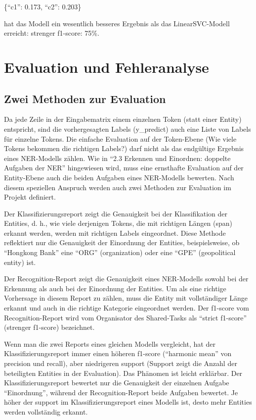 \documentclass[paper=A4, ngerman, fontsize=12pt]{article}
\begin{document}
	\indent
	 \{\enquote{c1}: 0.173, \enquote{c2}: 0.203\}
	 
	 \indent
	 hat das Modell ein wesentlich besseres Ergebnis als das LinearSVC-Modell erreicht: strenger f1-score: 75\%.
	 
	\section{Evaluation und Fehleranalyse}
	
	\subsection{Zwei Methoden zur Evaluation}
	\noindent
	Da jede Zeile in der Eingabematrix einem einzelnen Token (statt einer Entity) entspricht, sind die vorhergesagten Labels (y\_predict) auch eine Liste von Labels für einzelne Tokens. Die einfache Evaluation auf der Token-Ebene (Wie viele Tokens bekommen die richtigen Labels?) darf nicht als das endgültige Ergebnis eines NER-Modells zählen. Wie in \enquote{2.3 Erkennen und Einordnen: doppelte Aufgaben der NER} hingewiesen wird, muss eine ernsthafte Evaluation auf der Entity-Ebene auch die beiden Aufgaben eines NER-Modells bewerten. Nach diesem speziellen Anspruch werden auch zwei Methoden zur Evaluation im Projekt definiert. 
	
	\indent
	Der Klassifizierungsreport zeigt die Genauigkeit bei der Klassifikation der Entities, d. h., wie viele derjenigen Tokens, die mit richtigen Längen (span) erkannt werden, werden mit richtigen Labels eingeordnet. Diese Methode reflektiert nur die Genauigkeit der Einordnung der Entities, beispielsweise, ob \enquote{Hongkong Bank} eine \enquote{ORG} (organization) oder eine \enquote{GPE} (geopolitical entity) ist.
	
	\indent
	Der Recognition-Report zeigt die Genauigkeit eines NER-Modells sowohl bei der Erkennung als auch bei der Einordnung der Entities. Um als eine richtige Vorhersage in diesem Report zu zählen, muss die Entity mit vollständiger Länge erkannt und auch in die richtige Kategorie eingeordnet werden. Der f1-score vom Recognition-Report wird vom Organisator des Shared-Tasks als \enquote{strict f1-score} (strenger f1-score) bezeichnet.  
	
	\indent
	Wenn man die zwei Reports eines gleichen Modells vergleicht, hat der Klassifizierungsreport immer einen höheren f1-score (\enquote{harmonic mean} von precision und recall), aber niedrigeren support (Support zeigt die Anzahl der beteiligten Entities in der Evaluation). Das Phänomen ist leicht erklärbar. Der Klassifizierungsreport bewertet nur die Genauigkeit der einzelnen Aufgabe \enquote{Einordnung}, während der Recognition-Report beide Aufgaben bewertet. Je höher der support im Klassifizierungsreport eines Modells ist, desto mehr Entities werden vollständig erkannt. 
	
\end{document}

